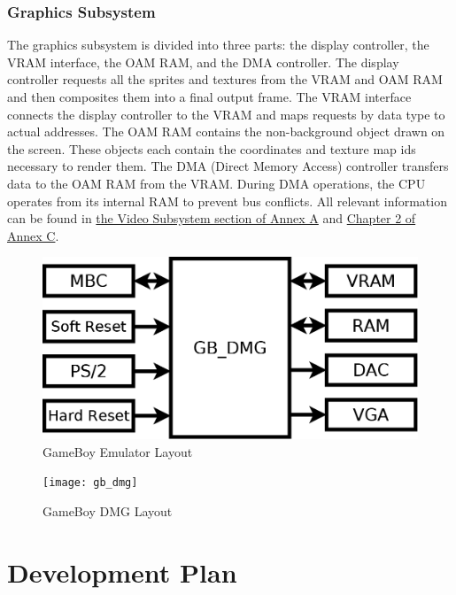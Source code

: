 \documentclass[12pt,letterpaper,titlepage, final]{report}
\begin{document}
\begin{raggedright}
\subsubsection{Graphics Subsystem}
The graphics subsystem is divided into three parts: the display controller, the VRAM interface, the OAM RAM, and the DMA controller. The display controller requests all the sprites and textures from the VRAM and OAM RAM and then composites them into a final output frame. The VRAM interface connects the display controller to the VRAM and maps requests by data type to actual addresses. The OAM RAM contains the non-background object drawn on the screen. These objects each contain the coordinates and texture map ids necessary to render them. The DMA (Direct Memory Access) controller transfers data to the OAM RAM from the VRAM. During DMA operations, the CPU operates from its internal RAM to prevent bus conflicts. All relevant information can be found in \hyperlink{videosub}{the Video Subsystem section of Annex A} and \hyperlink{page.58}{Chapter 2 of Annex C}.


\begin{figure}[ht]
\centering
\includegraphics[width=\textwidth, height=0.3\textheight, keepaspectratio=true]{gb_block}
\hypertarget{fig3}{\caption{GameBoy Emulator Layout}}
\end{figure}

\clearpage


\begin{figure}[ht]
\centering
\texttt{[image: gb\_dmg]}
\hypertarget{fig4}{\caption{GameBoy DMG Layout}}
\end{figure}

\clearpage

\hypertarget{devplan}{\section{Development Plan}}


\end{raggedright}
\end{document}

